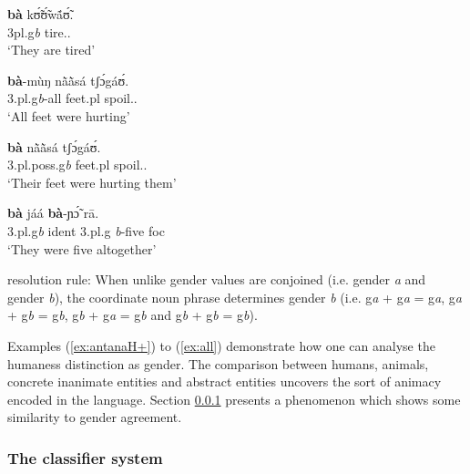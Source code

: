 \begin{exe}
\begin{exe}
\begin{exe}
{\begin{exe}
\begin{exe}
\begin{exe}
\begin{exe}
\begin{exe}
\begin{exe}
\begin{exe}
\begin{exe}
\begin{exe}
\begin{exe}
\begin{exe}
\begin{exe}
\begin{exe}
\begin{exe}
\begin{exe}
\begin{exe}
\begin{exe}
\begin{exe}
\begin{exe}
\ex\label{ex:Tamanaphor}

\gll  \textbf{bà}  kʊ̃́ʊ̃́wã́ʊ̃́.\\
    {{\sc 3pl}.{\sc g}{\it b}} tire.{\pfv}.{\foc}\\
\glt `They are tired'\\

\ex\label{ex:Tamquant}

\gll   \textbf{bà}-mùŋ  nã̀ã̀sá tʃɔ́gáʊ́.\\
    {3.{\sc pl}.{\sc g}{\it b}-all} {feet.{\sc pl}} spoil.{\pfv}.{\foc}\\
\glt `All  feet were hurting'\\

\ex\label{ex:Tamposs}

\gll  \textbf{bà}  nã̀ã̀sá  tʃɔ́gáʊ́.\\
  {{\sc 3.pl.poss.g}{\it b}}  {feet.{\sc pl}}  spoil.{\pfv}.{\foc}\\
\glt `Their feet were hurting them'\\

\ex\label{ex:Tamnum}

\gll   \textbf{bà}  jáá \textbf{bà}-ɲɔ̃́  rā.\\
  {{\sc 3.pl.g}{\it b}} {\sc ident}
{3.{\sc pl}.{\sc g}{\it
b}-five} {\sc foc}\\
\glt `They were five altogether'\\


\ex\label{ex:rule}

{\sc resolution rule}: When unlike gender values are conjoined
(i.e. {\sc gender} {\it  a} and {\sc gender} {\it b}), the
coordinate noun phrase determines {\sc gender} {\it b} (i.e.
{\sc g}{\it a} + {\sc g}{\it a} = {\sc g}{\it a},
{\sc g}{\it a} + {\sc g}{\it b} = {\sc g}{\it b},
{\sc g}{\it b} + {\sc g}{\it a} = {\sc g}{\it b} and
{\sc g}{\it b} + {\sc g}{\it b} = {\sc g}{\it b}).




\z 
 \z

Examples (\ref{ex:antanaH+}) to (\ref{ex:all}) demonstrate how one can analyse
the humaness distinction as gender. The comparison between humans, animals,
concrete inanimate entities and abstract entities uncovers the sort of animacy
encoded in the language. Section \ref{sec:classifier}  presents a phenomenon 
which
shows
some similarity to gender agreement.



\subsubsection{The classifier system}
\label{sec:classifier}



\end{exe}
\end{exe}
\end{exe}
\end{exe}
\end{exe}
\end{exe}
\end{exe}
\end{exe}
\end{exe}
\end{exe}
\end{exe}
\end{exe}
\end{exe}
\end{exe}
\end{exe}
\end{exe}
\end{exe}
\end{exe}
\end{exe}}
\end{exe}
\end{exe}
\end{exe}
